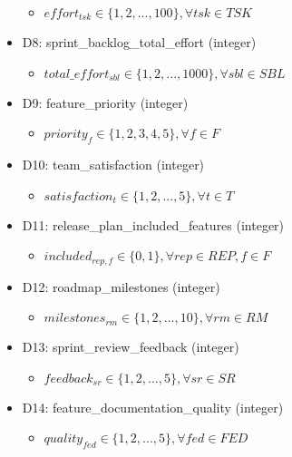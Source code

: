 \documentclass{article}
\begin{document}
\begin{itemize}
\begin{itemize}
            \item $effort_{tsk} \in \{1,2,...,100\}, \forall tsk \in TSK$
        \end{itemize}
    \item D8: sprint\_backlog\_total\_effort (integer)
        \begin{itemize}
            \item $total\_effort_{sbl} \in \{1,2,...,1000\}, \forall sbl \in SBL$
        \end{itemize}
    \item D9: feature\_priority (integer)
        \begin{itemize}
            \item $priority_f \in \{1,2,3,4,5\}, \forall f \in F$
        \end{itemize}
    \item D10: team\_satisfaction (integer)
        \begin{itemize}
            \item $satisfaction_t \in \{1,2,...,5\}, \forall t \in T$
        \end{itemize}
    \item D11: release\_plan\_included\_features (integer)
        \begin{itemize}
            \item $included_{rep,f} \in \{0,1\}, \forall rep \in REP, f \in F$
        \end{itemize}
    \item D12: roadmap\_milestones (integer)
        \begin{itemize}
            \item $milestones_{rm} \in \{1,2,...,10\}, \forall rm \in RM$
        \end{itemize}
    \item D13: sprint\_review\_feedback (integer)
        \begin{itemize}
            \item $feedback_{sr} \in \{1,2,...,5\}, \forall sr \in SR$
        \end{itemize}
    \item D14: feature\_documentation\_quality (integer)
        \begin{itemize}
            \item $quality_{fed} \in \{1,2,...,5\}, \forall fed \in FED$
        \end{itemize}
\end{itemize}
\end{document}
